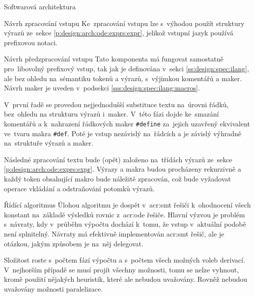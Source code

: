 \documentclass[thesis=M,czech]{FITthesis}[2012/06/26]
\newcommand{\acrlabel}[1]{acr:#1}
\newcommand{\acr}[1]{\acrshort{\acrlabel{#1}}}
\newcommand{\id}[1]{\texttt{#1}}
\newcommand{\rf}[1]{\ref{#1}}
\begin{document}
\begin{section}{Softwarová architektura}
\begin{subsection}{Návrh zpracování vstupu}
Ke~zpracování vstupu lze s~výhodou
použít struktury výrazů
ze~sekce \rf{p:design:arch:ode:exprs:expr},
jelikož vstupní jazyk používá prefixovou notaci.
\end{subsection} %


\begin{subsection}{Návrh předzpracování vstupu}
\label{ss:design:arch:preprocess}
Tato komponenta má fungovat samostatně pro~libovolný prefixový vstup,
tak jak je definována v~sekci \rf{ss:design:spec:ilang},
ale bez ohledu na~sémantiku tokenů a výrazů,
s~výjimkou komentářů a maker.
Návrh maker je uveden v~podsekci \rf{sss:design:spec:ilang:macros}.

V~první řadě se provedou nejjednodušší substituce textu
na~úrovni řádků, bez~ohledu na strukturu výrazů i~maker.
V~této fázi dojde ke~smazání komentářů
a k~nahrazení řádkových maker \id{\#define}
za~jejich uzavřený ekvivalent ve~tvaru makra \id{\#def}.
Poté je vstup nezávislý na~řádcích
a je závislý výhradně na~struktuře výrazů a maker.

Následné zpracování textu bude (opět) založeno na~třídách výrazů
ze~sekce \rf{p:design:arch:ode:exprs:expr}.
Výrazy a makra budou procházeny rekurzivně
a každý token obsahující makro bude náležitě zpracován,
což bude vyžadovat operace vkládání a odstraňování potomků výrazů.
\end{subsection} %


\begin{subsection}{Řídící algoritmus}\label{ss:design:arch:alg}
Úlohou algoritmu je dospět v~\acr{smt} řešiči
k~ohodnocení všech konstant
na~základě výsledků rovnic z~\acr{ode} řešiče.
Hlavní výzvou je problém s~návraty,
kdy v~průběhu výpočtu dochází k~tomu,
že vstup v~aktuální podobě není splnitelný.
Návraty má efektivně implementován \acr{smt} řešič,
ale je otázkou, jakým způsobem je na~něj delegovat.

Složitost roste s~počtem fází výpočtu
a s~počtem všech možných voleb derivací.
V~nejhorším případě se musí projít všechny možnosti,
tomu se nelze vyhnout, kromě použití nějakých heuristik,
které ale nebudou uvažovány.
Rovněž nebudou uvažovány možnosti paralelizace.



\end{subsection}
\end{section}
\end{document}
